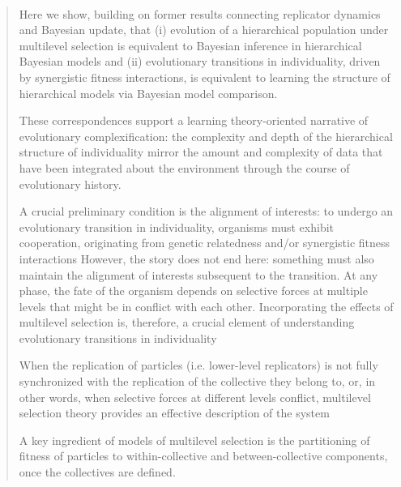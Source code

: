 \documentclass[a4paper,10pt]{article}
\begin{document}
\\

\begin{quotation} \cite{czegel2019-bayesianEvolution}

    Here we show, building on former results connecting replicator dynamics and Bayesian update, that (i) evolution of a hierarchical population under multilevel selection is equivalent to Bayesian inference in hierarchical Bayesian models and (ii) evolutionary transitions in individuality, driven by synergistic fitness interactions, is equivalent to learning the structure of hierarchical models via Bayesian model comparison.

    These correspondences support a learning theory-oriented narrative of evolutionary complexification: the complexity and depth of the hierarchical structure of individuality mirror the amount and complexity of data that have been integrated about the environment through the course of evolutionary history.
    
    A crucial preliminary condition is the alignment of interests: to undergo an evolutionary transition in individuality, organisms must exhibit cooperation, originating from genetic relatedness and/or synergistic fitness interactions
    However, the story does not end here: something must also maintain the alignment of interests subsequent to the transition.
    At any phase, the fate of the organism depends on selective forces at multiple levels that might be in conflict with each other.
    Incorporating the effects of multilevel selection is, therefore, a crucial element of understanding evolutionary transitions in individuality
    
    When the replication of particles (i.e. lower-level replicators) is not fully synchronized with the replication of the collective they belong to, or, in other words, when selective forces at different levels conflict, multilevel selection theory provides an effective description of the system
    
    A key ingredient of models of multilevel selection is the partitioning of fitness of particles to within-collective and between-collective components, once the collectives are defined.
    
    
    
    
\end{quotation}

\\
\end{document}
